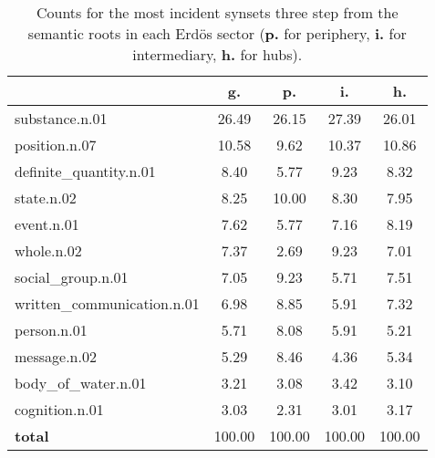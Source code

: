 \begin{table}[h!]
\begin{center}
\begin{tabular}{| l || c | c | c | c |}\hline
 & {\bf g.} & {\bf p.} & {\bf i.} & {\bf h.} \\\hline\hline
substance.n.01 & 26.49  & 26.15  & 27.39  & 26.01 \\\hline
position.n.07 & 10.58  & 9.62  & 10.37  & 10.86 \\\hline
definite\_quantity.n.01 & 8.40  & 5.77  & 9.23  & 8.32 \\\hline
state.n.02 & 8.25  & 10.00  & 8.30  & 7.95 \\\hline
event.n.01 & 7.62  & 5.77  & 7.16  & 8.19 \\\hline
whole.n.02 & 7.37  & 2.69  & 9.23  & 7.01 \\\hline
social\_group.n.01 & 7.05  & 9.23  & 5.71  & 7.51 \\\hline
written\_communication.n.01 & 6.98  & 8.85  & 5.91  & 7.32 \\\hline
person.n.01 & 5.71  & 8.08  & 5.91  & 5.21 \\\hline
message.n.02 & 5.29  & 8.46  & 4.36  & 5.34 \\\hline
body\_of\_water.n.01 & 3.21  & 3.08  & 3.42  & 3.10 \\\hline
cognition.n.01 & 3.03  & 2.31  & 3.01  & 3.17 \\\hline\hline
{{\bf total}} & 100.00  & 100.00  & 100.00  & 100.00 \\\hline
\end{tabular}
\caption{Counts for the most incident synsets three step from the semantic roots in each Erd\"os sector ({\bf p.} for periphery, {\bf i.} for intermediary, {\bf h.} for hubs).}
\end{center}
\end{table}